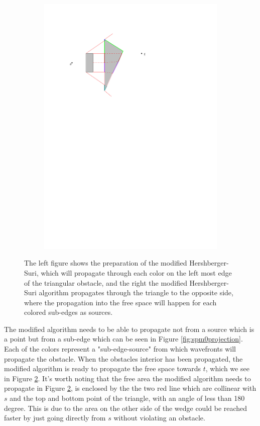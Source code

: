 \begin{figure}[H]
\begin{subfigure}{.5\textwidth}
  \includegraphics[width=.95\linewidth]{figures/spm1.pdf}
  \caption{}
  \label{fig:spm1}
\end{subfigure}
\caption{The left figure shows the preparation of the modified Hershberger-Suri, which will propagate 
         through each color on the left most edge of the triangular obstacle, and the right the modified 
         Hershberger-Suri algorithm propagates through the triangle to the opposite side, where the 
         propagation into the free space will happen for each colored sub-edges as sources.}
\end{figure}

The modified algorithm needs to be able to propagate not from a source which is a point but 
from a sub-edge which can be seen in Figure \ref{fig:spm0projection}. Each of the colors 
represent a "sub-edge-source" from which wavefronts will propagate the obstacle. When the 
obstacles interior has been propagated, the modified algorithm is ready to propagate the free 
space towards $t$, which we see in Figure \ref{fig:spm1}. It's worth noting that the free area 
the modified algorithm needs to propagate in Figure \ref{fig:spm1}, is enclosed by the the two 
red line which are collinear with $s$ and the top and bottom point of the triangle, with an 
angle of less than 180 degree. This is due to the area on the other side of the wedge could be 
reached faster by just going directly from $s$ without violating an obstacle.

